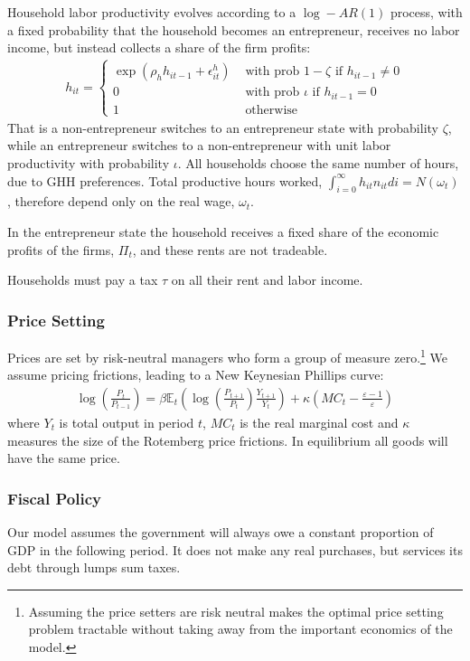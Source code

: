 \documentclass[titlepage]{\econtex}\newcommand{\texname}{ConsumptionHeterogeneity}
\begin{document}
Household labor productivity evolves according to a $\log-AR(1)$ process, with a fixed probability that the household becomes an entrepreneur, receives no labor income, but instead collects a share of the firm profits:
\begin{align*}
h_{it} = \begin{cases}
				\exp(\rho_h h_{it-1} + \epsilon^h_{it}) &\text{ with prob } 1-\zeta \text{ if } h_{it-1} \ne 0\\
				0 &\text{  with prob } \iota \text{ if } h_{it-1} = 0 \\
				1	&\text{ otherwise}
\end{cases}
\end{align*}
That is a non-entrepreneur switches to an entrepreneur state with probability $\zeta$, while an entrepreneur switches to a non-entrepreneur with unit labor productivity with probability $\iota$. All households choose the same number of hours, due to GHH preferences. Total productive hours worked, $\int_{i=0}^{\infty} h_{it}n_{it}di = N(\omega_t)$, therefore depend only on the real wage, $\omega_t$.

In the entrepreneur state the household receives a fixed share of the economic profits of the firms, $\Pi_t$, and these rents are not tradeable.

Households must pay a tax $\tau$ on all their rent and labor income.

\subsubsection{Price Setting}
Prices are set by risk-neutral managers who form a group of measure zero.\footnote{Assuming the price setters are risk neutral makes the optimal price setting problem tractable without taking away from the important economics of the model.} We assume \cite{rotemberg_sticky_1982} pricing frictions, leading to a New Keynesian Phillips curve:
\begin{align*}
\log\left(\frac{P_t}{P_{t-1}}\right) = \beta \mathbb{E}_t \left( \log \left(\frac{P_{t+1}}{P_{t}}\right) \frac{Y_{t+1}}{Y_{t}} \right) + \kappa \left( MC_t - \frac{\varepsilon-1}{\varepsilon} \right)
\end{align*}
where $Y_t$ is total output in period $t$, $MC_t$ is the real marginal cost and $\kappa$ measures the size of the Rotemberg price frictions. In equilibrium all goods will have the same price.

\subsubsection{Fiscal Policy}
Our model assumes the government will always owe a constant proportion of GDP in the following period. It does not make any real purchases, but services its debt through lumps sum taxes.
\end{document}
